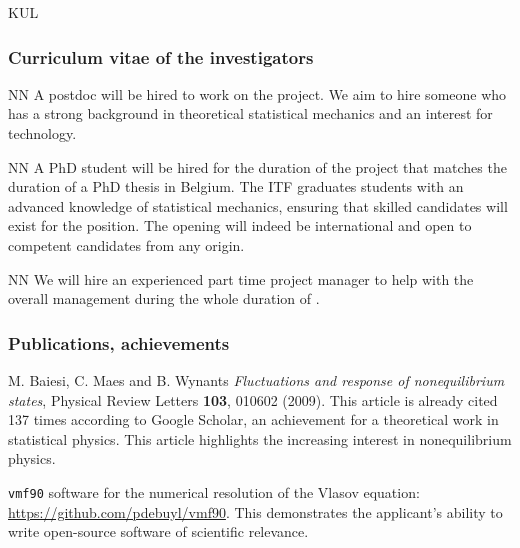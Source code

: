 \begin{sitedescription}{KUL}
\subsubsection*{Curriculum vitae of the investigators}




\begin{participant}[type=res,PM=48,salary=5500]{NN}
A postdoc will be hired to work on the project. We aim to hire someone who has a strong
background in theoretical statistical mechanics and an interest for technology.
\end{participant}

\begin{participant}[type=res,PM=48,salary=3500]{NN}
A PhD student will be hired for the duration of the project that matches the duration of a
PhD thesis in Belgium. The ITF graduates students with an advanced knowledge of statistical
mechanics, ensuring that skilled candidates will exist for the position.
%
The opening will indeed be international and open to competent candidates from any
origin.
\end{participant}

\begin{participant}[type=res,PM=24,salary=3932]{NN}
We will hire an experienced part time project manager to help with the overall management
during the whole duration of \TheProject.
\end{participant}

\subsubsection*{Publications, achievements}

\begin{compactenum}
\item M. Baiesi, C. Maes and B. Wynants {\em Fluctuations and response of nonequilibrium
  states}, Physical Review Letters {\bf 103}, 010602 (2009). This article is already cited
137 times according to Google Scholar, an achievement for a theoretical work in statistical
physics. This article highlights the increasing interest in nonequilibrium physics.
\item {\tt vmf90} software for the numerical resolution of the Vlasov equation:
\url{https://github.com/pdebuyl/vmf90}. This demonstrates the applicant's ability to write
open-source software of scientific relevance.
\end{compactenum}



\end{sitedescription}

